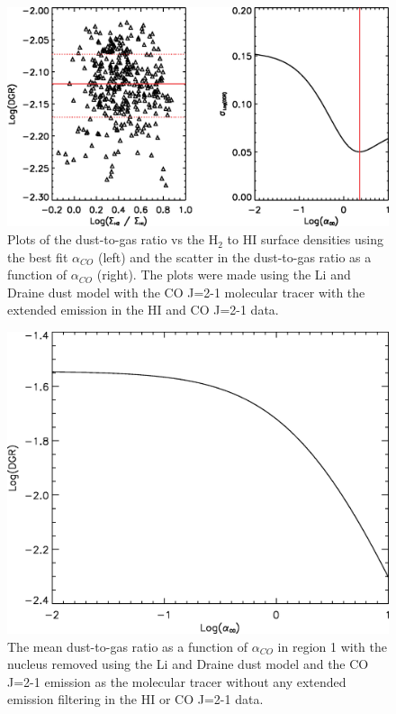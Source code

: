  \begin{figure}
   \centering
   \includegraphics[width=1.\textwidth]{dgr_imgs/region_1-3_aco_output_21_no_filtf.eps}
   \caption[Unfiltered Dust-to-Gas Ratio Determination Plots for CO J=2-1]{Plots of the dust-to-gas ratio vs the H$_2$ to HI surface densities using the best fit $\alpha_{CO}$ (left) and the scatter in the dust-to-gas ratio as a function of $\alpha_{CO}$ (right).  The plots were made using the Li and Draine dust model with the CO J=2-1 molecular tracer with the extended emission in the HI and CO J=2-1 data.}
   \label{fig:filt_dgr}
\end{figure}
 
 \begin{figure}
   \centering
   \includegraphics[width=1.\textwidth]{dgr_imgs/region_1-3_aco_dgr_nff.eps}
   \caption[Mean Dust-to-Gas Ratio vs $\alpha_{CO}$ Without Extended Emission Filtering]{The mean dust-to-gas ratio as a function of $\alpha_{CO}$ in region 1 with the nucleus removed using the Li and Draine dust model and the CO J=2-1 emission as the molecular tracer without any extended emission filtering in the HI or CO J=2-1 data.} 
    \label{fig:filt_aco_dgr}
\end{figure}
 
